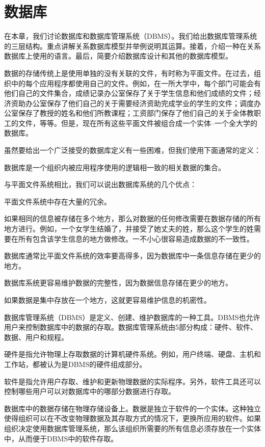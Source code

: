 \chapter{数据库}
在本章，我们讨论数据库和数据库管理系统（DBMS）。我们给出数据库管理系统的三层结构。重点讲解关系数据库模型并举例说明其运算。接着，介绍一种在关系数据库上使用的语言。最后，简要介绍数据库设计和其他的数据库模型。

数据的存储传统上是使用单独的没有关联的文件，有时称为平面文件。在过去，组织中的每个应用程序都使用自己的文件。例如，在一所大学中，每个部门可能会有他们自己的文件集合，成绩记录办公室保存了关于学生信息和他们成绩的文件；经济资助办公室保存了他们自己的关于需要经济资助完成学业的学生的文件；调度办公室保存了教授的姓名和他们所教课程；工资部门保存了他们自己的关于全体教职工的文件，等等。但是，现在所有这些平面文件被组合成一个实体--一个全大学的数据库。

虽然要给出一个广泛接受的数据库定义有一些困难，但我们使用下面通常的定义：

数据库是一个组织内被应用程序使用的逻辑相一致的相关数据的集合。

与平面文件系统相比，我们可以说出数据库系统的几个优点：

平面文件系统中存在大量的冗余。

如果相同的信息被存储在多个地方，那么对数据的任何修改需要在数据存储的所有地方进行。例如，一个女学生结婚了，并接受了她丈夫的姓，那么这个学生的姓需要在所有包含该学生信息的地方做修改。一不小心很容易造成数据的不一致性。

数据库通常比平面文件系统的效率要高得多，因为数据库中一条信息存储在更少的地方。

数据库系统更容易维护数据的完整性，因为数据信息存储在更少的地方。

如果数据是集中存放在一个地方，这就更容易维护信息的机密性。

数据库管理系统（DBMS）是定义、创建、维护数据库的一种工具。DBMS也允许用户来控制数据库中的数据的存取。数据库管理系统由5部分构成：硬件、软件、数据、用户和规程。

硬件是指允许物理上存取数据的计算机硬件系统。例如，用户终端、硬盘、主机和工作站，都被认为是DBMS的硬件组成部分。

软件是指允许用户存取、维护和更新物理数据的实际程序。另外，软件工具还可以控制哪些用户可以对数据库中的哪部分数据进行存取。

数据库中的数据存储在物理存储设备上。数据是独立于软件的一个实体。这种独立使得组织可以在不改变物理数据及其存取方式的情况下，更换所应用的软件。如果组织决定使用数据库管理系统，那么该组织所需要的所有信息必须存放在一个实体中，从而便于DBMS中的软件存取。

